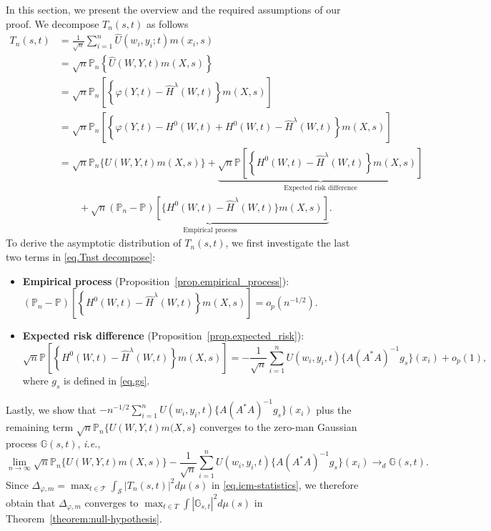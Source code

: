 \documentclass[
  12pt]{article}
\def\to{\rightarrow}
\def\mG{\mathbb{G}}
\begin{document}
In this section, we present the overview and the required assumptions of our proof. We decompose $T_n(s,t)$ as follows
\begin{equation}\label{eq.Tnst decompose}
    \begin{aligned}
	T_n(s,t)&=\frac{1}{\sqrt{n}}\sum_{i=1}^n{\widehat{U}(w_i,y_i;t)m(x_i,s)}\\ &=\sqrt{n}\mathbb{P}_n\left\{ \widehat{U}(W,Y,t)m(X,s) \right\}\\
	&=\sqrt{n}\mathbb{P}_n\left[ \left\{ \varphi(Y,t) -\widehat{H}^{\lambda}(W,t) \right\} m(X,s) \right]\\
	&=\sqrt{n}\mathbb{P}_n\left[ \left\{ \varphi(Y,t) -H^0(W,t) +H^0(W,t) -\widehat{H}^{\lambda}(W,t)\right\}  m(X,s) \right]\\
	&= \sqrt{n}\mathbb{P}_n\{ U(W,Y,t) m(X,s) \}+\underbrace{\sqrt{n}\mathbb{P} \left[ \left\{ H^0(W,t) -\widehat{H}^{\lambda}(W,t)\right\} m(X,s) \right]}_{\text{Expected risk difference}} \\
	&\qquad+\underset{ \text{Empirical process} }{\underbrace{\sqrt{n}( \mathbb{P}_n-\mathbb{P}) \left[\{ H^0(W,t) -\widehat{H}^{\lambda}(W,t)\} m(X,s) \right] }}.
\end{aligned}
\end{equation}
To derive the asymptotic distribution of $T_n(s,t)$, we first investigate the last two terms in \eqref{eq.Tnst decompose}:
\begin{itemize}
    \item \textbf{Empirical process} (Proposition~\ref{prop.empirical_process}): $(\mathbb{P}_n-\mathbb{P}) \left[ \left\{ H^0(W,t) -\widehat{H}^{\lambda}(W,t)\right\} m(X,s) \right]=o_p(n^{-1/2})$. 
    \item \textbf{Expected risk difference} (Proposition~\ref{prop.expected_risk}): 
    \begin{equation*}
        \sqrt{n}\mathbb{P} \left[ \left\{ H^0(W,t) -\widehat{H}^{\lambda}(W,t)\right\} m(X,s) \right]=-\frac{1}{\sqrt{n}}\sum_{i=1}^n{U(w_i,y_i,t) \{A(A^*A)^{-1}g_s\}(x_i)}+o_{p}(1),
    \end{equation*}
    where $g_s$ is defined in \eqref{eq.gs}. 
\end{itemize}
Lastly, we show that $-n^{-1/2}\sum_{i=1}^nU(w_i,y_i,t) \{A(A^*A)^{-1}g_s\}(x_i)$ plus the remaining term $\sqrt{n}\mathbb{P}_n\{ U(W,Y,t)m(X,s\}$ converges to the zero-man Gaussian process $\mG(s,t)$, \emph{i.e.}, 
\begin{equation*}
    \lim_{n \to \infty} \sqrt{n}\mathbb{P}_n\{ U(W,Y,t) m(X,s) \}-\frac{1}{\sqrt{n}}\sum_{i=1}^n{U(w_i,y_i,t) \{A(A^*A)^{-1}g_s\}(x_i)} \to_d \mathbb{G}(s,t). 
\end{equation*}
Since $\Delta_{\varphi ,m} =\max_{t\in\mathcal{T}}\int_{\mathcal{S}}{| T_n(s,t)| ^2d\mu (s)}$ in \eqref{eq.icm-statistics}, we therefore obtain that $\Delta_{\varphi,m}$ converges to $\max_{t \in T} \int |\mG_{s,t}|^2d\mu(s)$ in Theorem~\ref{theorem:null-hypothesis}. 
\end{document}

